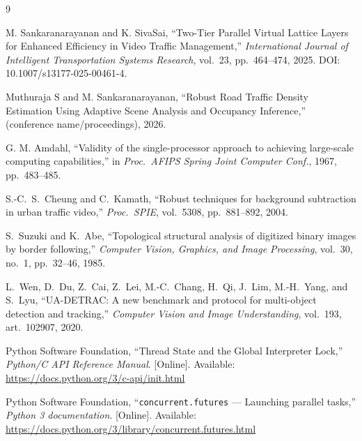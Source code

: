 \documentclass[conference]{IEEEtran}
\newcommand{\code}[1]{\texttt{#1}}
\begin{document}
\begin{thebibliography}{9}

M. Sankaranarayanan and K. SivaSai, ``Two-Tier Parallel Virtual Lattice
Layers for Enhanced Efficiency in Video Traffic Management,''
\emph{International Journal of Intelligent Transportation Systems
Research}, vol.\ 23, pp.\ 464--474, 2025. DOI:
10.1007/s13177-025-00461-4.

Muthuraja S and M. Sankaranarayanan, ``Robust Road Traffic Density
Estimation Using Adaptive Scene Analysis and Occupancy Inference,''
(conference name/proceedings), 2026.

G. M. Amdahl, ``Validity of the single-processor approach to achieving
large-scale computing capabilities,'' in \emph{Proc.\ AFIPS Spring Joint
Computer Conf.}, 1967, pp.\ 483--485.

S.-C.\ S.\ Cheung and C.\ Kamath, ``Robust techniques for background
subtraction in urban traffic video,'' \emph{Proc.\ SPIE}, vol.\ 5308,
pp.\ 881--892, 2004.

S.\ Suzuki and K.\ Abe, ``Topological structural analysis of digitized
binary images by border following,'' \emph{Computer Vision, Graphics,
and Image Processing}, vol.\ 30, no.\ 1, pp.\ 32--46, 1985.

L.\ Wen, D.\ Du, Z.\ Cai, Z.\ Lei, M.-C.\ Chang, H.\ Qi, J.\ Lim,
M.-H.\ Yang, and S.\ Lyu, ``UA-DETRAC: A new benchmark and protocol for
multi-object detection and tracking,'' \emph{Computer Vision and Image
Understanding}, vol.\ 193, art.\ 102907, 2020.

Python Software Foundation, ``Thread State and the Global Interpreter
Lock,'' \emph{Python/C API Reference Manual}. [Online]. Available:
\url{https://docs.python.org/3/c-api/init.html}

Python Software Foundation, ``\code{concurrent.futures} --- Launching
parallel tasks,'' \emph{Python 3 documentation}. [Online]. Available:
\url{https://docs.python.org/3/library/concurrent.futures.html}

\end{thebibliography}
\end{document}

